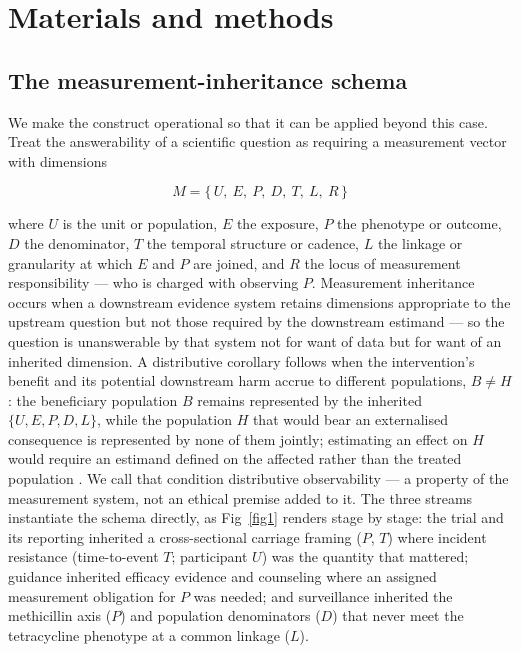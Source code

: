 \documentclass[10pt,letterpaper]{article}
\begin{document}
\section*{Materials and methods}

\subsection*{The measurement-inheritance schema}

We make the construct operational so that it can be applied beyond this
case. Treat the answerability of a scientific question as requiring a
measurement vector with dimensions

\[M = \{\,U,\ E,\ P,\ D,\ T,\ L,\ R\,\}\]

where \(U\) is the unit or population, \(E\) the exposure, \(P\) the
phenotype or outcome, \(D\) the denominator, \(T\) the temporal
structure or cadence, \(L\) the linkage or granularity at which \(E\)
and \(P\) are joined, and \(R\) the locus of measurement responsibility
--- who is charged with observing \(P\). Measurement
inheritance occurs when a downstream evidence system retains dimensions
appropriate to the upstream question but not those required by
the downstream estimand --- so the question is unanswerable by
that system not for want of data but for want of an inherited dimension.
A distributive corollary follows when the intervention's benefit and its
potential downstream harm accrue to different populations, \(B \neq H\):
the beneficiary population \(B\) remains represented by the inherited
\(\{U,E,P,D,L\}\), while the population \(H\) that would bear an
externalised consequence is represented by none of them jointly; estimating an effect on $H$ would require an estimand defined on the affected rather than the treated population \cite{montoya2025affected}. We call that condition distributive observability --- a property of the
measurement system, not an ethical premise added to it. The three streams instantiate the schema directly, as Fig~\ref{fig1} renders stage by stage: the trial and its reporting inherited a cross-sectional carriage framing ($P$, $T$) where incident resistance (time-to-event $T$; participant $U$) was the quantity that mattered; guidance inherited efficacy evidence and counseling where an assigned measurement obligation for $P$ was needed; and surveillance inherited the methicillin axis ($P$) and population denominators ($D$) that never meet the tetracycline phenotype at a common linkage ($L$).
\end{document}

